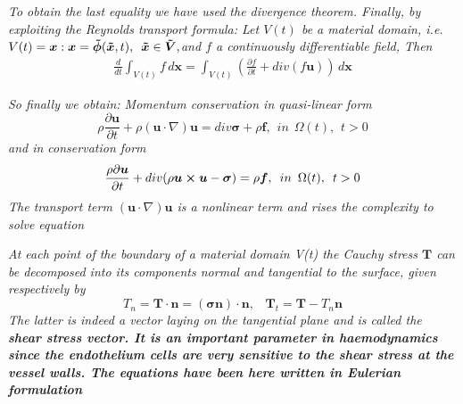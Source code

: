 \documentclass[11pt,letterpaper]{article}
\begin{document}
\textit{To obtain the last equality we have used the divergence theorem. Finally, by exploiting the Reynolds transport formula: \newline
  Let $V(t)$ be a material domain, i.e. $V(t)= \bm{x} : \bm{x}= \bm{\Tilde{\phi}}(\bm{\Tilde{x}},t), \hspace{5pt} \bm{\Tilde{x}} \in  \bm{\Tilde{V}},$and $f$ a   continuously differentiable field, Then
\begin{align}
 \frac{d}{dt}\int_{V(t)} f \hspace{2pt}d\bm{x} = \int_{V(t)} ( \frac{\partial f}{\partial t} + div(f\bm{u}) )\hspace{2pt} d\bm{x}
\end{align}
}

\textit{So finally we obtain: Momentum conservation in quasi-linear form
\begin{equation}
\rho  \frac{\partial \bm{u}}{\partial t} + \rho (\bm{u} \cdot \nabla) \bm{u} = div \bm{\sigma} + \rho\bm{f}, \hspace{5pt} in \hspace{5pt} \Omega(t), \hspace{5pt}t>0
\end{equation}
and in conservation form
\begin{equation}
 \frac{\rho \partial \bm{u}}{\partial t} + div(\rho \bm{u} \cross \bm{u}-\bm{\sigma}) =\rho\bm{f}, \hspace{5pt} in \hspace{5pt} \Omega(t), \hspace{5pt}t>0
\end{equation}
The transport term $(\bm{u} \cdot \nabla) \bm{u}$ is a nonlinear term and rises the complexity to solve equation
}

\textit{At each point of the boundary of a material domain V(t) the Cauchy
stress $\bm{T}$ can be decomposed into its components normal and tangential to the surface, given respectively by\begin{equation}
    T_n = \bm{T} \cdot \bm{n} = (\bm{\sigma} \bm{n}) \cdot \bm{n}, \hspace{10pt }\bm{T}_t = \bm{T}- T_n\bm{n}
\end{equation}
 The latter is indeed a vector laying on the tangential plane and is called
the \bf{shear stress vector}.
\textbf{It is an important parameter in haemodynamics since the endothelium cells are very sensitive to the shear stress at the vessel walls}. The equations
have been here written in Eulerian formulation
}
\end{document}
